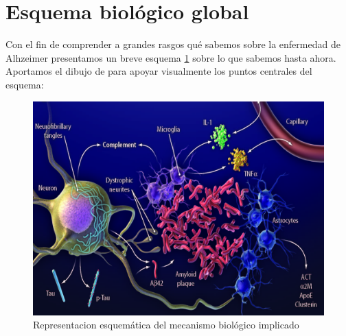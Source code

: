 \documentclass[1p]{elsarticle}
\begin{document}
\section{Esquema biológico global}
Con el fin de comprender a grandes rasgos qué sabemos sobre la enfermedad de Alhzeimer presentamos un breve esquema \ref{cerebro5} sobre lo que sabemos hasta ahora. Aportamos el dibujo de \cite{bibid} para apoyar visualmente los puntos centrales del esquema:
\begin{figure}
	\begin{center}
	\includegraphics[scale=1]{imagen.jpg}
	\caption{Representacion esquemática del mecanismo biológico implicado}
	\label{cerebro5}
	\end{center}
\end{figure}
\end{document}
